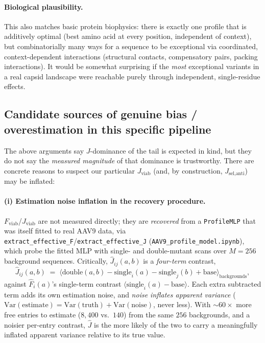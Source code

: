 \documentclass[11pt]{article}
\newcommand{\code}[1]{\texttt{#1}}
\begin{document}
\paragraph{Biological plausibility.} This also matches basic protein biophysics: there is exactly
one profile that is additively optimal (best amino acid at every position, independent of context),
but combinatorially many ways for a sequence to be exceptional via coordinated, context-dependent
interactions (structural contacts, compensatory pairs, packing interactions). It would be somewhat
surprising if the \emph{most} exceptional variants in a real capsid landscape were reachable purely
through independent, single-residue effects.

\subsection{Candidate sources of genuine bias / overestimation in this specific pipeline}

The above arguments say $J$-dominance of the tail is expected in kind, but they do not say the
\emph{measured magnitude} of that dominance is trustworthy. There are concrete reasons to suspect
our particular $J_{\text{viab}}$ (and, by construction, $J_{\text{sel,anti}}$) may be inflated:

\paragraph{(i) Estimation noise inflation in the recovery procedure.} $F_{\text{viab}}$/$J_{\text{viab}}$
are not measured directly; they are \emph{recovered} from a \code{ProfileMLP} that was itself
fitted to real AAV9 data, via \code{extract\_effective\_F}/\code{extract\_effective\_J}
(\code{AAV9\_profile\_model.ipynb}), which probe the fitted MLP with single- and double-mutant
scans over $M=256$ background sequences. Critically, $\hat J_{ij}(a,b)$ is a \emph{four-term}
contrast,
\[
  \hat J_{ij}(a,b) \;=\; \big\langle \text{double}(a,b) - \text{single}_i(a) - \text{single}_j(b) + \text{base} \big\rangle_{\text{backgrounds}},
\]
against $\hat F_i(a)$'s single-term contrast $\langle \text{single}_i(a) - \text{base}\rangle$. Each
extra subtracted term adds its own estimation noise, and \emph{noise inflates apparent variance}
($\mathrm{Var}(\text{estimate}) = \mathrm{Var}(\text{truth}) + \mathrm{Var}(\text{noise})$, never
less). With $\sim\!60\times$ more free entries to estimate ($8{,}400$ vs.\ $140$) from the same
$256$ backgrounds, and a noisier per-entry contrast, $\hat J$ is the more likely of the two to carry
a meaningfully inflated apparent variance relative to its true value.
\end{document}
